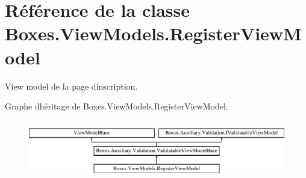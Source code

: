 \hypertarget{class_boxes_1_1_view_models_1_1_register_view_model}{}\section{Référence de la classe Boxes.\+View\+Models.\+Register\+View\+Model}
\label{class_boxes_1_1_view_models_1_1_register_view_model}


View model de la page d\textquotesingle{}inscription.  


Graphe d\textquotesingle{}héritage de Boxes.\+View\+Models.\+Register\+View\+Model\+:\begin{figure}[H]
\begin{center}
\leavevmode
\includegraphics[height=2.576687cm]{class_boxes_1_1_view_models_1_1_register_view_model}
\end{center}
\end{figure}
